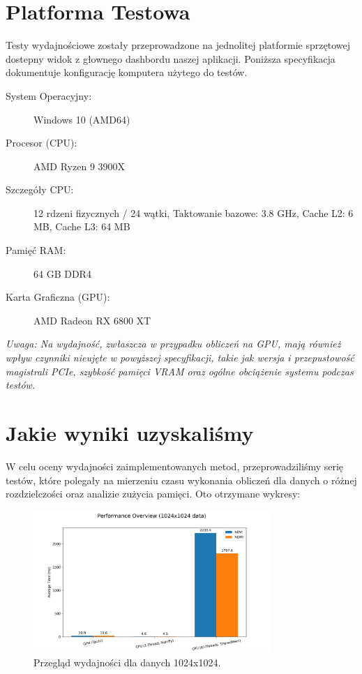 \documentclass[12pt,a4paper]{article}
\begin{document}
\section{Platforma Testowa}
Testy wydajnościowe zostały przeprowadzone na jednolitej platformie sprzętowej dostepny widok z głownego dashbordu naszej aplikacji. Poniższa specyfikacja dokumentuje konfigurację komputera użytego do testów. 

\begin{description}
    \item[System Operacyjny:] Windows 10 (AMD64)
    \item[Procesor (CPU):] AMD Ryzen 9 3900X
    \item[Szczegóły CPU:] 12 rdzeni fizycznych / 24 wątki, Taktowanie bazowe: 3.8 GHz, Cache L2: 6 MB, Cache L3: 64 MB
    \item[Pamięć RAM:] 64 GB DDR4
    \item[Karta Graficzna (GPU):] AMD Radeon RX 6800 XT
\end{description}

\textit{Uwaga: Na wydajność, zwłaszcza w przypadku obliczeń na GPU, mają również wpływ czynniki nieujęte w powyższej specyfikacji, takie jak wersja i przepustowość magistrali PCIe, szybkość pamięci VRAM oraz ogólne obciążenie systemu podczas testów.}

\section{Jakie wyniki uzyskaliśmy}
W celu oceny wydajności zaimplementowanych metod, przeprowadziliśmy serię testów,
które polegały na mierzeniu czasu wykonania obliczeń dla danych o różnej rozdzielczości oraz analizie zużycia pamięci. Oto otrzymane wykresy:

\begin{figure}[H]
    \centering
    \includegraphics[width=0.8\textwidth]{charts/01_performance_overview.png}
    \caption{Przegląd wydajności dla danych 1024x1024.}
    \label{fig:overview}
\end{figure}
\end{document}
